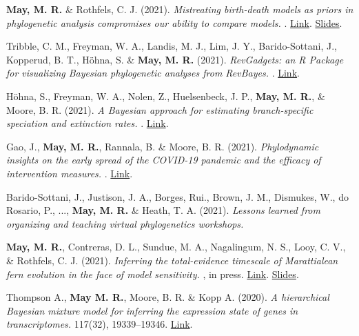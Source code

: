 \begin{etaremune}[topsep=0pt,itemsep=1.0em,partopsep=0pt,parsep=0pt]
    \item \textbf{May, M. R.} \& Rothfels, C. J. (2021). \textit{Mistreating birth-death models as priors in phylogenetic analysis compromises our ability to compare models.} . \href{https://www.biorxiv.org/content/10.1101/2021.07.12.452074v1}{Link}. \href{https://www.youtube.com/watch?v=SWldXeWet68&feature=youtu.be}{Slides}.
    \item Tribble, C. M., Freyman, W. A., Landis, M. J., Lim, J. Y., Barido-Sottani, J., Kopperud, B. T., Höhna, S. \& \textbf{May, M. R.} (2021). \textit{RevGadgets: an R Package for visualizing Bayesian phylogenetic analyses from RevBayes.} . \href{https://www.biorxiv.org/content/10.1101/2021.05.10.443470v1}{Link}.
    \item Höhna, S., Freyman, W. A., Nolen, Z., Huelsenbeck, J. P., \textbf{May, M. R.}, \& Moore, B. R. (2021). \textit{A Bayesian approach for estimating branch-specific speciation and extinction rates.} . \href{https://www.biorxiv.org/content/10.1101/2021.07.12.452074v1}{Link}.
    \item Gao, J., \textbf{May, M. R.}, Rannala, B. \& Moore, B. R. (2021). \textit{Phylodynamic insights on the early spread of the COVID-19 pandemic and the efficacy of intervention measures.} . \href{https://www.biorxiv.org/content/10.1101/2021.05.01.442286v1}{Link}.
    \item Barido-Sottani, J., Justison, J. A., Borges, Rui., Brown, J. M., Dismukes, W., do Rosario, P., ..., \textbf{May, M. R.} \& Heath, T. A. (2021). \textit{Lessons learned from organizing and teaching virtual phylogenetics workshops.} 
    \item \textbf{May, M. R.}, Contreras, D. L., Sundue, M. A., Nagalingum, N. S., Looy, C. V., \& Rothfels, C. J. (2021). \textit{Inferring the total-evidence timescale of Marattialean fern evolution in the face of model sensitivity.} , in press. \href{https://doi.org/10.1093/sysbio/syab020}{Link}. \href{https://www.youtube.com/watch?v=5H_u9bjn064}{Slides}.
    \item Thompson A., \textbf{May M. R.}, Moore, B. R. \& Kopp A. (2020). \textit{A hierarchical Bayesian mixture model for inferring the expression state of genes in transcriptomes.}  117(32), 19339–19346. \href{https://doi.org/10.1073/pnas.1919748117}{Link}.

\end{etaremune}
